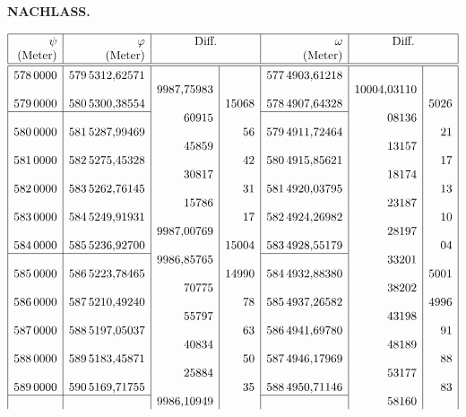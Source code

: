 \par\clearpage
{}\hfill{\small\textbf{NACHLASS.}}\hfill\null\par\medskip
{\small\renewcommand{\arraystretch}{.82}
\[\begin{array}{|r|r|r|r|r|r|r|}\hline
\rule{0pt}{2.1ex}\psi&\varphi&\multicolumn{2}{c|}{\text{Diff.}}&\omega&\multicolumn{2}{c|}{\text{Diff.}}\\
\rule[-3.6pt]{0pt}{3.6pt}\text{(Meter)}&\text{(Meter)}&\multicolumn{2}{c|}{}&\text{(Meter)}&\multicolumn{2}{c|}{}\\\hline\hline
\rule{0pt}{2.5ex}578\,0000&579\,5312{,}62571&&&577\,4903{,}61218&&\\
&&9987{,}75983&&&10004{,}03110&\\
579\,0000&580\,5300{,}38554&&15068&578\,4907{,}64328&&5026\\
\cline{1-2}\cline{5-5}
&&60915&&&08136&\\
580\,0000&581\,5287{,}99469&&56&579\,4911{,}72464&&21\\
&&45859&&&13157&\\
581\,0000&582\,5275{,}45328&&42&580\,4915{,}85621&&17\\
&&30817&&&18174&\\
582\,0000&583\,5262{,}76145&&31&581\,4920{,}03795&&13\\
&&15786&&&23187&\\
583\,0000&584\,5249{,}91931&&17&582\,4924{,}26982&&10\\
&&9987{,}00769&&&28197&\\
584\,0000&585\,5236{,}92700&&15004&583\,4928{,}55179&&04\\
\cline{1-2}\cline{5-5}
&&9986{,}85765&&&33201&\\
585\,0000&586\,5223{,}78465&&14990&584\,4932{,}88380&&5001\\
&&70775&&&38202&\\
586\,0000&587\,5210{,}49240&&78&585\,4937{,}26582&&4996\\
&&55797&&&43198&\\
587\,0000&588\,5197{,}05037&&63&586\,4941{,}69780&&91\\
&&40834&&&48189&\\
588\,0000&589\,5183{,}45871&&50&587\,4946{,}17969&&88\\
&&25884&&&53177&\\
589\,0000&590\,5169{,}71755&&35&588\,4950{,}71146&&83\\
\cline{1-2}\cline{5-5}
&&9986{,}10949&&&58160&\\

\end{array}\]}

